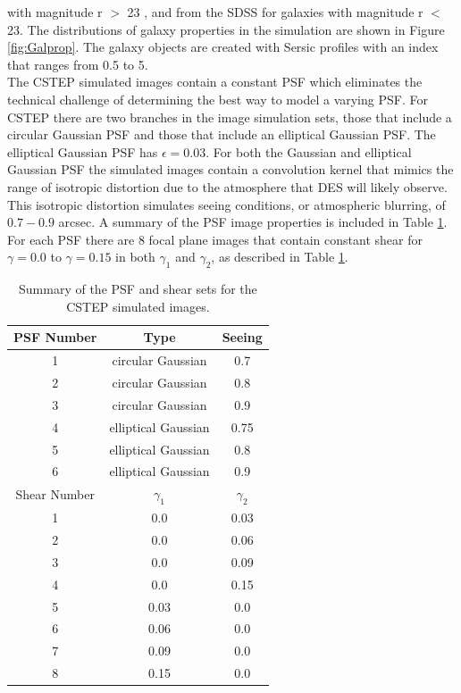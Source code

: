 with magnitude r $ > $ 23 , and from the SDSS for
galaxies with magnitude r $ < $ 23. The distributions of galaxy
properties in the simulation are shown in Figure \ref{fig:Galprop}. 
The galaxy objects are created with Sersic profiles with an
index that ranges from 0.5 to 5.  \\
\indent The CSTEP simulated images contain a constant
PSF which eliminates the technical challenge of determining the best
way to model a varying PSF. For CSTEP there are two
branches in the image simulation sets, those that include a circular
Gaussian PSF and those that include an elliptical Gaussian PSF. 
The elliptical Gaussian PSF has $ \epsilon =
0.03 $. For both the Gaussian and elliptical Gaussian
PSF the simulated images contain a convolution kernel that mimics the
range of isotropic distortion due to the atmosphere that DES will
likely observe. This isotropic distortion simulates seeing conditions,
or atmospheric blurring, of $ 0.7 - 0.9 $ arcsec. 
A summary of the PSF image properties is included in Table \ref{table:tab2}. 
For each PSF there are 8 focal plane images that contain constant
shear for $\gamma = 0.0$ to $\gamma = 0.15$ in both
$\gamma_1$ and $\gamma_2$, as described in Table \ref{table:tab2}.  
\begin{table}
\begin{centering}
\begin{tabular}{ccc}
\hline
PSF Number & Type & Seeing  \\
\hline
1 & circular Gaussian & 0.7 \\
2 & circular Gaussian & 0.8 \\
3 & circular Gaussian & 0.9 \\
4 & elliptical Gaussian & 0.75 \\
5 & elliptical Gaussian & 0.8  \\
6 & elliptical Gaussian & 0.9  \\
\hline
\hline
Shear Number & $ \gamma_1 $ & $ \gamma_2 $  \\
\hline
1 &  0.0 & 0.03 \\
2 &  0.0 & 0.06 \\
3 &  0.0 & 0.09 \\
4 &  0.0 & 0.15 \\
5 &  0.03 & 0.0 \\
6 &  0.06 & 0.0 \\
7 &  0.09 & 0.0 \\
8 &  0.15 & 0.0 \\
\hline
\end{tabular}
\end{centering}
\caption{ Summary of the PSF and shear sets for the CSTEP simulated images. }
\label{table:tab2}
\end{table}
